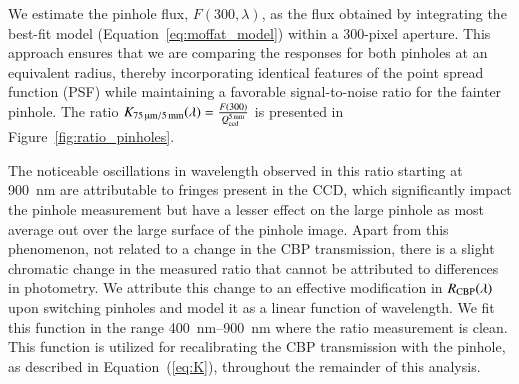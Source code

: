

We estimate the pinhole flux, $F(300, \lambda)$, as the flux obtained by integrating the best-fit model (Equation~\ref{eq:moffat_model}) within a 300-pixel aperture. This approach ensures that we are comparing the \SD responses for both pinholes at an equivalent radius, thereby incorporating identical features of the point spread function (PSF) while maintaining a favorable signal-to-noise ratio for the fainter pinhole. The ratio $K_\mathrm{\SI{75}{\micro\meter}/\SI{5}{\milli\meter}}(\lambda)=\frac{F(300)}{Q_{\mathrm{ccd}}^{\SI{5}{\milli\meter}}}$ is presented in Figure~\ref{fig:ratio_pinholes}.

The noticeable oscillations in wavelength observed in this ratio starting at \SI{900}{nm} are attributable to fringes present in the CCD, which significantly impact the \spinhole pinhole measurement but have a lesser effect on the large pinhole as most average out over the large surface of the pinhole image. Apart from this phenomenon, not related to a change in the CBP transmission, there is a slight chromatic change in the measured ratio that cannot be attributed to differences in photometry. We attribute this change to an effective modification in $R_{\mathrm{CBP}}(\lambda)$ upon switching pinholes and model it as a linear function of wavelength. We fit this function in the range \SIrange{400}{900}{\nano\meter} where the ratio measurement is clean. This function is utilized for recalibrating the CBP transmission with the \spinhole pinhole, as described in Equation~(\ref{eq:K}), throughout the remainder of this analysis.

